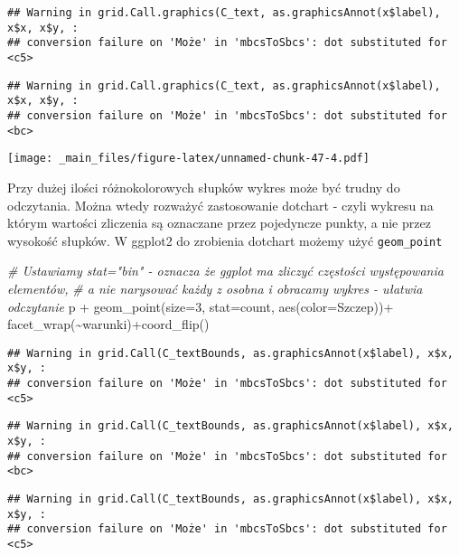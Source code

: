 \documentclass[
]{book}
\newenvironment{Shaded}{\begin{snugshade}}{\end{snugshade}}
\newcommand{\AttributeTok}[1]{\textcolor[rgb]{0.77,0.63,0.00}{#1}}
\newcommand{\CommentTok}[1]{\textcolor[rgb]{0.56,0.35,0.01}{\textit{#1}}}
\newcommand{\DecValTok}[1]{\textcolor[rgb]{0.00,0.00,0.81}{#1}}
\newcommand{\FunctionTok}[1]{\textcolor[rgb]{0.00,0.00,0.00}{#1}}
\newcommand{\NormalTok}[1]{#1}
\newcommand{\SpecialCharTok}[1]{\textcolor[rgb]{0.00,0.00,0.00}{#1}}
\newcommand{\StringTok}[1]{\textcolor[rgb]{0.31,0.60,0.02}{#1}}
\begin{document}
\begin{verbatim}
## Warning in grid.Call.graphics(C_text, as.graphicsAnnot(x$label), x$x, x$y, :
## conversion failure on 'Może' in 'mbcsToSbcs': dot substituted for <c5>
\end{verbatim}

\begin{verbatim}
## Warning in grid.Call.graphics(C_text, as.graphicsAnnot(x$label), x$x, x$y, :
## conversion failure on 'Może' in 'mbcsToSbcs': dot substituted for <bc>
\end{verbatim}

\texttt{[image: \_main\_files/figure-latex/unnamed-chunk-47-4.pdf]}

Przy dużej ilości różnokolorowych słupków wykres może być trudny do odczytania. Można wtedy rozważyć zastosowanie dotchart - czyli wykresu na którym wartości zliczenia są oznaczane przez pojedyncze punkty, a nie przez wysokość słupków. W ggplot2 do zrobienia dotchart możemy użyć \texttt{geom\_point}

\begin{Shaded}
\begin{Highlighting}[]
\CommentTok{\# Ustawiamy stat="bin" {-} oznacza że ggplot ma zliczyć częstości występowania elementów,}
\CommentTok{\# a nie narysować każdy z osobna i obracamy wykres {-} ułatwia odczytanie}
\NormalTok{p }\SpecialCharTok{+} \FunctionTok{geom\_point}\NormalTok{(}\AttributeTok{size=}\DecValTok{3}\NormalTok{, }\AttributeTok{stat=}\StringTok{\textquotesingle{}count\textquotesingle{}}\NormalTok{, }\FunctionTok{aes}\NormalTok{(}\AttributeTok{color=}\NormalTok{Szczep))}\SpecialCharTok{+}
  \FunctionTok{facet\_wrap}\NormalTok{(}\SpecialCharTok{\textasciitilde{}}\NormalTok{warunki)}\SpecialCharTok{+}\FunctionTok{coord\_flip}\NormalTok{()}
\end{Highlighting}
\end{Shaded}

\begin{verbatim}
## Warning in grid.Call(C_textBounds, as.graphicsAnnot(x$label), x$x, x$y, :
## conversion failure on 'Może' in 'mbcsToSbcs': dot substituted for <c5>
\end{verbatim}

\begin{verbatim}
## Warning in grid.Call(C_textBounds, as.graphicsAnnot(x$label), x$x, x$y, :
## conversion failure on 'Może' in 'mbcsToSbcs': dot substituted for <bc>
\end{verbatim}

\begin{verbatim}
## Warning in grid.Call(C_textBounds, as.graphicsAnnot(x$label), x$x, x$y, :
## conversion failure on 'Może' in 'mbcsToSbcs': dot substituted for <c5>
\end{verbatim}
\end{document}
